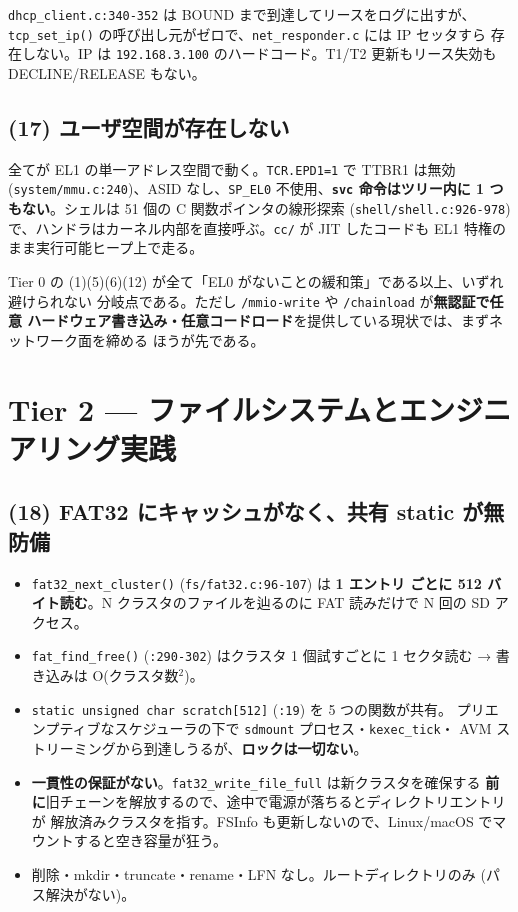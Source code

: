 \documentclass[a4paper,11pt]{ltjsarticle}
\begin{document}
\texttt{dhcp\_client.c:340-352} は BOUND まで到達してリースをログに出すが、
\texttt{tcp\_set\_ip()} の呼び出し元がゼロで、\texttt{net\_responder.c} には IP セッタすら
存在しない。IP は \texttt{192.168.3.100} のハードコード。T1/T2 更新もリース失効も
DECLINE/RELEASE もない。

\subsection{(17) ユーザ空間が存在しない}

全てが EL1 の単一アドレス空間で動く。\texttt{TCR.EPD1=1} で TTBR1 は無効
(\texttt{system/mmu.c:240})、ASID なし、\texttt{SP\_EL0} 不使用、\textbf{\texttt{svc}
命令はツリー内に 1 つもない}。シェルは 51 個の C 関数ポインタの線形探索
(\texttt{shell/shell.c:926-978}) で、ハンドラはカーネル内部を直接呼ぶ。\texttt{cc/} が
JIT したコードも EL1 特権のまま実行可能ヒープ上で走る。

Tier 0 の (1)(5)(6)(12) が全て「EL0 がないことの緩和策」である以上、いずれ避けられない
分岐点である。ただし \texttt{/mmio-write} や \texttt{/chainload} が\textbf{無認証で任意
ハードウェア書き込み・任意コードロード}を提供している現状では、まずネットワーク面を締める
ほうが先である。

\section{Tier 2 --- ファイルシステムとエンジニアリング実践}

\subsection{(18) FAT32 にキャッシュがなく、共有 static が無防備}

\begin{itemize}[leftmargin=1.4em,itemsep=2pt]
\item \texttt{fat32\_next\_cluster()} (\texttt{fs/fat32.c:96-107}) は\textbf{ 1 エントリ
      ごとに 512 バイト読む}。N クラスタのファイルを辿るのに FAT 読みだけで N 回の SD アクセス。
\item \texttt{fat\_find\_free()} (\texttt{:290-302}) はクラスタ 1 個試すごとに 1 セクタ読む
      → 書き込みは O(クラスタ数$^2$)。
\item \texttt{static unsigned char scratch[512]} (\texttt{:19}) を 5 つの関数が共有。
      プリエンプティブなスケジューラの下で \texttt{sdmount} プロセス・\texttt{kexec\_tick}・
      AVM ストリーミングから到達しうるが、\textbf{ロックは一切ない}。
\item \textbf{一貫性の保証がない}。\texttt{fat32\_write\_file\_full} は新クラスタを確保する
      \textbf{前に}旧チェーンを解放するので、途中で電源が落ちるとディレクトリエントリが
      解放済みクラスタを指す。FSInfo も更新しないので、Linux/macOS でマウントすると空き容量が狂う。
\item 削除・mkdir・truncate・rename・LFN なし。ルートディレクトリのみ (パス解決がない)。
\end{itemize}
\end{document}
